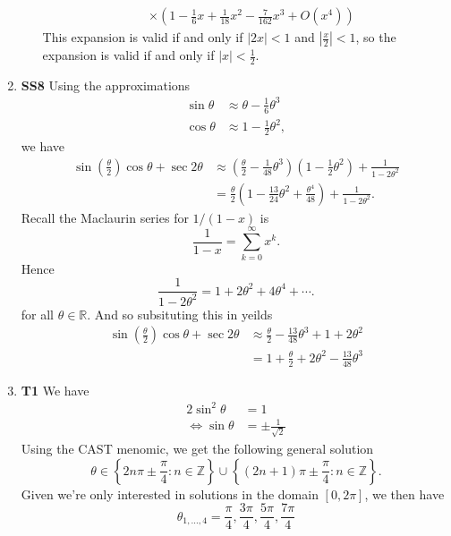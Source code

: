 \documentclass[12pt,oneside]{book}
\begin{document}
\begin{enumerate}
\begin{enumerate}
\begin{align*}
                &\times \left( 1 - \frac{1}{6}x + \frac{1}{18}x^2 - \frac{7}{162}x^3 + O(x^4)  \right)
            \end{align*}
            This expansion is valid if and only if $|2x| < 1$ and $\left| \frac{x}{2} \right| < 1$, so the expansion is valid if and only if $|x| < \frac{1}{2}$.
        \end{enumerate}
        \item \textbf{SS8} Using the approximations \begin{align*}
            \sin \theta &\approx \theta - \frac{1}{6}\theta^3 \\
            \cos \theta &\approx 1 - \frac{1}{2}\theta^2,
        \end{align*}
        we have \begin{align*}
            \sin \left( \frac{\theta}{2} \right) \cos \theta + \sec 2\theta &\approx \left( \frac{\theta}{2} - \frac{1}{48} \theta^3 \right) \left( 1 - \frac{1}{2}\theta^2 \right) + \frac{1}{1-2\theta^2} \\
            &= \frac{\theta}{2} \left( 1- \frac{13}{24} \theta^2 + \frac{\theta^4}{48} \right) + \frac{1}{1-2\theta^2}.
        \end{align*}
        Recall the Maclaurin series for $1/(1-x)$ is \[
            \frac{1}{1-x} = \sum_{k=0}^{\infty} x^k 
        .\] Hence \[
            \frac{1}{1-2\theta^2} = 1 + 2\theta^2 + 4 \theta^4 + \cdots
        .\] for all $\theta \in \mathbb{R}$. And so subsituting this in yeilds \begin{align*}
            \sin \left( \frac{\theta}{2} \right) \cos \theta + \sec 2\theta &\approx \frac{\theta}{2} - \frac{13}{48} \theta^3 + 1 + 2\theta^2 \\
            &= 1 + \frac{\theta}{2} + 2\theta^2 - \frac{13}{48}\theta^3
        \end{align*}
        \item \textbf{T1} We have \begin{align*}
            2\sin^2 \theta &= 1 \\
            \iff \sin \theta &= \pm \frac{1}{\sqrt{2}}
        \end{align*}
        Using the CAST menomic, we get the following general solution \[
            \theta \in \left\{ 2n\pi \pm \frac{\pi}{4} : n \in \mathbb{Z} \right \} \cup \left\{(2n+1)\pi \pm \frac{\pi}{4} : n \in \mathbb{Z}\right\} 
        .\] Given we're only interested in solutions in the domain $[0, 2\pi]$, we then have \[
            \theta_{1, \ldots, 4} = \frac{\pi}{4}, \frac{3\pi}{4}, \frac{5\pi}{4}, \frac{7\pi}{4}
\]
\end{enumerate}
\end{document}
